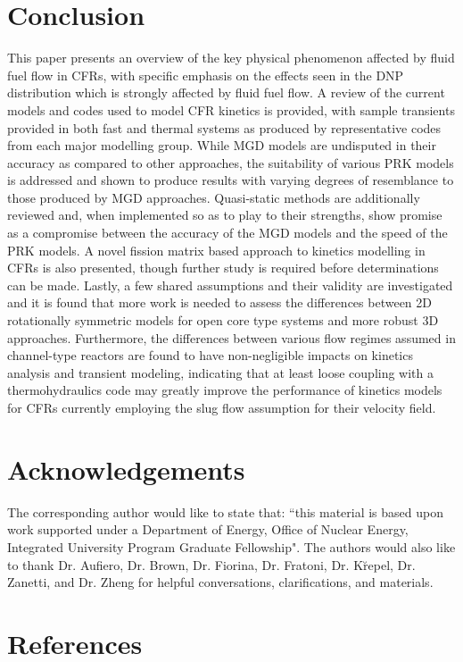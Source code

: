 \documentclass[review]{elsarticle}
\begin{document}
\section{Conclusion} \label{sec:conc}
This paper presents an overview of the key physical phenomenon affected
 by fluid fuel
flow in CFRs, with specific emphasis on the effects seen
in the DNP distribution which is strongly affected by fluid fuel flow.
A review of the current models and codes used to
model CFR kinetics is provided, with sample transients provided in both
fast and thermal systems as produced by representative codes from each major
modelling group. While MGD models are undisputed in their accuracy as compared
to other approaches, the suitability of various PRK models is addressed
and shown to produce results with varying degrees of resemblance to
those produced by MGD approaches. Quasi-static methods are additionally 
reviewed and, when implemented so as to play to their strengths, show promise
as a compromise between the accuracy of the MGD models and the speed of the PRK
models. A novel fission matrix based approach to kinetics modelling in CFRs is
also presented, though further study is required before determinations can be
made. Lastly, a few shared assumptions and their validity are investigated and
it is found that more work is needed to assess the differences between 2D 
rotationally symmetric models for open core type systems and more robust 3D
approaches. Furthermore, the differences between various flow regimes assumed
in channel-type reactors are found to have non-negligible impacts on kinetics
analysis and transient modeling, indicating that at least loose coupling with
a thermohydraulics code may greatly improve the performance of kinetics models
for CFRs currently employing the slug flow assumption for their velocity field.

\section{Acknowledgements} \label{sec:ack}
The corresponding author would like to state that: ``this material is based
upon work supported under a Department of Energy, Office of Nuclear Energy,
Integrated University Program Graduate Fellowship". The authors would also
like to thank Dr. Aufiero, Dr. Brown, Dr. Fiorina, Dr. Fratoni, 
Dr. K{\u r}epel, 
Dr. Zanetti, and Dr. Zheng for helpful conversations, clarifications, and
materials.  

\section*{References}
\end{document}
